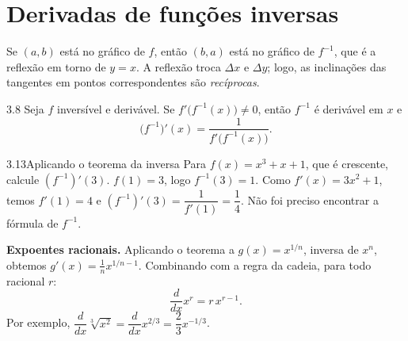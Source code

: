 \section{Derivadas de funções inversas}

Se $(a,b)$ está no gráfico de $f$, então $(b,a)$ está no gráfico de $f^{-1}$, que é a
reflexão em torno de $y=x$. A reflexão troca $\Delta x$ e $\Delta y$; logo, as inclinações
das tangentes em pontos correspondentes são \emph{recíprocas}.


\begin{teorema}{3.8}
Seja $f$ inversível e derivável. Se $f'\big(f^{-1}(x)\big)\neq0$, então $f^{-1}$ é derivável em
$x$ e
\[
\big(f^{-1}\big)'(x)=\frac{1}{f'\big(f^{-1}(x)\big)} .
\]
\end{teorema}

\begin{exemplo}{3.13}{Aplicando o teorema da inversa}
Para $f(x)=x^3+x+1$, que é crescente, calcule $(f^{-1})'(3)$.
\solucao
$f(1)=3$, logo $f^{-1}(3)=1$. Como $f'(x)=3x^2+1$, temos $f'(1)=4$ e
$(f^{-1})'(3)=\dfrac1{f'(1)}=\dfrac14$. Não foi preciso encontrar a fórmula de $f^{-1}$.
\end{exemplo}

\textbf{Expoentes racionais.} Aplicando o teorema a $g(x)=x^{1/n}$, inversa de $x^n$,
obtemos $g'(x)=\frac1n x^{1/n-1}$. Combinando com a regra da cadeia, para todo racional $r$:
\[
\frac{d}{dx}x^r=r\,x^{r-1}.
\]
Por exemplo, $\dfrac{d}{dx}\sqrt[3]{x^2}=\dfrac{d}{dx}x^{2/3}=\dfrac23x^{-1/3}$.

